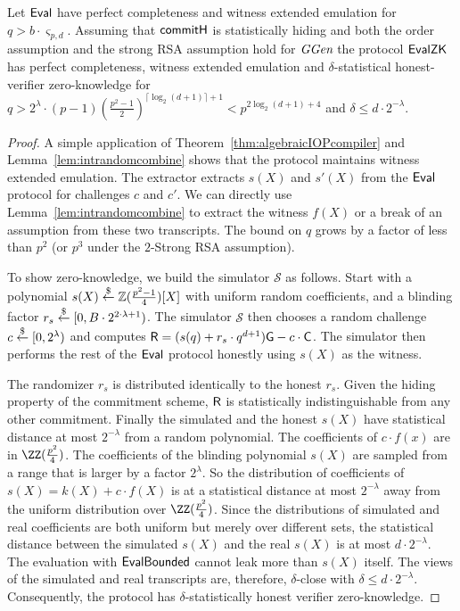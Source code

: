 
\begin{theorem}
Let $\textsf{{Eval}}$ have perfect completeness and witness extended emulation for $q> b\cdot \boldsymbol{\varsigma}_{p, d}$. Assuming that $\textsf{{commitH}}$ is statistically hiding and both the order assumption and the strong RSA assumption hold for $\textit{GGen}$ the protocol $\textsf{{EvalZK}}$ has perfect completeness, witness extended emulation and $\delta$-statistical honest-verifier zero-knowledge for $q>2^\lambda\cdot (p-1)(\frac{p^2-1}{2})^{\lceil \log_2(d+1)\rceil+1}<p^{2\log_2(d+1)+4}$ and $\delta \leq d \cdot 2^{-\lambda}$.
\end{theorem}

\begin{proof}
A simple application of Theorem~\ref{thm:algebraicIOPcompiler} and Lemma~\ref{lem:intrandomcombine} shows that the protocol maintains witness extended emulation. The extractor extracts $s(X)$ and $s'(X)$ from the $\textsf{{Eval}}$ protocol for challenges $c$ and $c'$. We can directly use Lemma~\ref{lem:intrandomcombine} to extract the witness $f(X)$ or a break of an assumption from these two transcripts. The bound on $q$ grows by a factor of less than $p^2$ (or $p^3$ under the $2$-Strong RSA assumption).   

To show zero-knowledge, we build the simulator $\mathcal{S}$ as follows. Start with a polynomial $s(X) \overset{\$}{\gets} \mathbb{Z}(\frac{p^2-1}{4})[X]$ with uniform random coefficients, and a blinding factor $r_s \overset{\$}{\gets} [0,B\cdot 2^{2\cdot\lambda+1})$. The simulator $\mathcal{S}$ then chooses a random challenge $c \overset{\$}{\gets} [0,2^\lambda)$ and computes $\gr{R} = (s(q) + r_s \cdot q^{d+1})\gr{g} -c\cdot \gr{C}$. The simulator then performs the rest of the $\textsf{{Eval}}$ protocol honestly using $s(X)$ as the witness. 

The randomizer $r_s$ is distributed identically to the honest $r_s$. Given the hiding property of the commitment scheme, $\gr{R}$ is statistically indistinguishable from any other commitment. Finally the simulated and the honest $s(X)$ have statistical distance at most $2^{-\lambda}$ from a random polynomial. The coefficients of $c\cdot f(x)$ are in $\ZZ(\frac{p^2}{4})$. The coefficients of the blinding polynomial $s(X)$ are sampled from a range that is larger by a factor $2^{\lambda}$. So the distribution of coefficients of $s(X) = k(X) + c \cdot f(X)$ is at a statistical distance at most $2^{-\lambda}$ away from the uniform distribution over $\ZZ(\frac{p^2}{4})$. Since the distributions of simulated and real coefficients are both uniform but merely over different sets, the statistical distance between the simulated $s(X)$ and the real $s(X)$ is at most $d \cdot 2^{-\lambda}$. The evaluation with $\textsf{{EvalBounded}}$ cannot leak more than $s(X)$ itself. The views of the simulated and real transcripts are, therefore, $\delta$-close with $\delta \leq d \cdot 2^{-\lambda}$. Consequently, the protocol has $\delta$-statistically honest verifier zero-knowledge.
\end{proof}